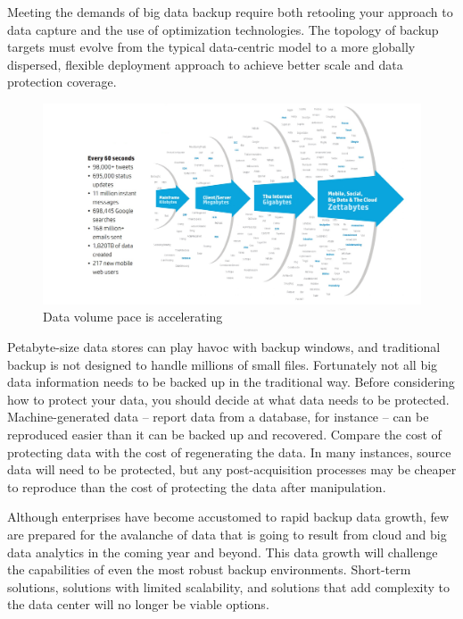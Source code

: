 Meeting the demands of big data backup require both retooling your
approach to data capture and the use of optimization technologies. The
topology of backup targets must evolve from the typical data-centric
model to a more globally dispersed, flexible deployment approach to
achieve better scale and data protection coverage. 

\begin{figure}[t]
    \begin{center}
        \includegraphics[scale=0.3]{images/graph3.png}
    \end{center}
    \caption{Data volume pace is accelerating}
    \label{fig:graph3}
\end{figure}

Petabyte-size data stores can play havoc with backup windows, and
traditional backup is not designed to handle millions of small files.
Fortunately not all big data information needs to be backed up in the
traditional way. Before considering how to protect your data, you should
decide at what data needs to be protected. Machine-generated data –
report data from a database, for instance – can be reproduced easier
than it can be backed up and recovered. Compare the cost of protecting
data with the cost of regenerating the data. In many instances, source
data will need to be protected, but any post-acquisition processes may
be cheaper to reproduce than the cost of protecting the data after
manipulation.

Although enterprises have become accustomed to rapid backup data growth,
few are prepared for the avalanche of data that is going to result from
cloud and big data analytics in the coming year and beyond. This data
growth will challenge the capabilities of even the most robust backup
environments. Short-term solutions, solutions with limited scalability,
and solutions that add complexity to the data center will no longer be
viable options.

